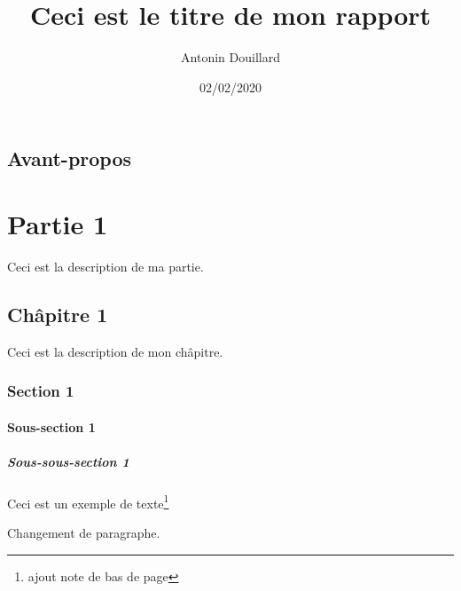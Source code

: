 \documentclass[a4paper,french,11pt]{report}
\title{Ceci est le titre de mon rapport}
\author{Antonin Douillard}
\date{02/02/2020}
\begin{document}
\maketitle %


\chapter*{Avant-propos}

\part{Partie 1}
Ceci est la description de ma partie.

\chapter{Châpitre 1}
Ceci est la description de mon châpitre.

\section{Section 1}
\subsection{Sous-section 1}
\subsubsection{Sous-sous-section 1}

Ceci est un exemple de texte\thanks{ajout note de bas de page}

Changement de paragraphe.
\end{document}
